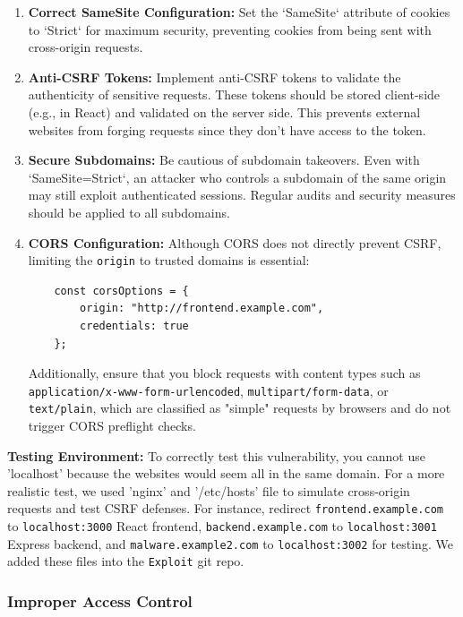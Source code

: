 \documentclass[]{article}
\begin{document}
\begin{enumerate}
    \item \textbf{Correct SameSite Configuration:}  
    Set the `SameSite` attribute of cookies to `Strict` for maximum security, preventing cookies from being sent with cross-origin requests.
    
    \item \textbf{Anti-CSRF Tokens:}  
    Implement anti-CSRF tokens to validate the authenticity of sensitive requests. These tokens should be stored client-side (e.g., in React) and validated on the server side. This prevents external websites from forging requests since they don't have access to the token.
    
    \item \textbf{Secure Subdomains:}  
    Be cautious of subdomain takeovers. Even with `SameSite=Strict`, an attacker who controls a subdomain of the same origin may still exploit authenticated sessions. Regular audits and security measures should be applied to all subdomains.
    
    \item \textbf{CORS Configuration:}  
    Although CORS does not directly prevent CSRF, limiting the \texttt{origin} to trusted domains is essential:
    \begin{lstlisting}
    const corsOptions = {
        origin: "http://frontend.example.com",
        credentials: true
    };
    \end{lstlisting}
    Additionally, ensure that you block requests with content types such as \texttt{application/x-www-form-urlencoded}, \texttt{multipart/form-data}, or \texttt{text/plain}, which are classified as "simple" requests by browsers and do not trigger CORS preflight checks.
\end{enumerate}

\textbf{Testing Environment:}
   To correctly test this vulnerability, you cannot use 'localhost' because the websites would seem all in the same domain. For a more realistic test, we used 'nginx' and '/etc/hosts' file to simulate cross-origin requests and test CSRF defenses. For instance, redirect \texttt{frontend.example.com} to \texttt{localhost:3000} React frontend, \texttt{backend.example.com} to \texttt{localhost:3001} Express backend, and \texttt{malware.example2.com} to \texttt{localhost:3002} for testing. We added these files into the \texttt{Exploit} git repo.


\subsubsection{Improper Access Control}
\label{subsubsec:improper_access_control}
\end{document}
